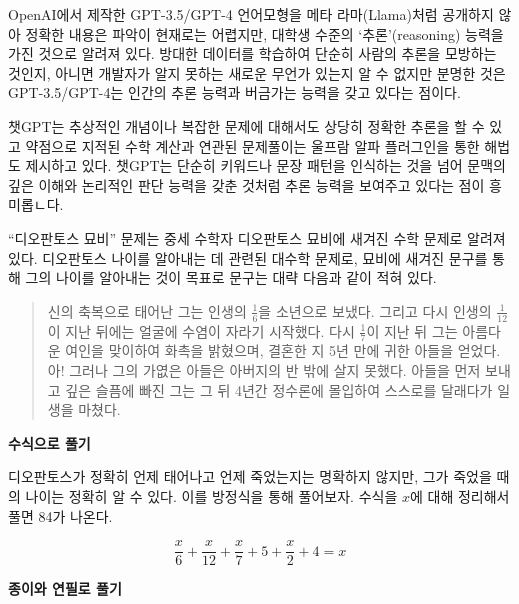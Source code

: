 \documentclass[
  letterpaper,
]{book}
\begin{document}
OpenAI에서 제작한 GPT-3.5/GPT-4 언어모형을 메타 라마(Llama)처럼 공개하지
않아 정확한 내용은 파악이 현재로는 어렵지만, 대학생 수준의
`추론'(reasoning) 능력을 가진 것으로 알려져 있다. 방대한 데이터를
학습하여 단순히 사람의 추론을 모방하는 것인지, 아니면 개발자가 알지
못하는 새로운 무언가 있는지 알 수 없지만 분명한 것은 GPT-3.5/GPT-4는
인간의 추론 능력과 버금가는 능력을 갖고 있다는 점이다.

챗GPT는 추상적인 개념이나 복잡한 문제에 대해서도 상당히 정확한 추론을 할
수 있고 약점으로 지적된 수학 계산과 연관된 문제풀이는 울프람 알파
플러그인을 통한 해법도 제시하고 있다. 챗GPT는 단순히 키워드나 문장
패턴을 인식하는 것을 넘어 문맥의 깊은 이해와 논리적인 판단 능력을 갖춘
것처럼 추론 능력을 보여주고 있다는 점이 흥미롭ㄴ다.

``디오판토스 묘비'' 문제는 중세 수학자 디오판토스 묘비에 새겨진 수학
문제로 알려져 있다. 디오판토스 나이를 알아내는 데 관련된 대수학 문제로,
묘비에 새겨진 문구를 통해 그의 나이를 알아내는 것이 목표로 문구는 대략
다음과 같이 적혀 있다.

\begin{quote}
신의 축복으로 태어난 그는 인생의 \(\frac{1}{6}\)을 소년으로 보냈다.
그리고 다시 인생의 \(\frac{1}{12}\) 이 지난 뒤에는 얼굴에 수염이 자라기
시작했다. 다시 \(\frac{1}{7}\)이 지난 뒤 그는 아름다운 여인을 맞이하여
화촉을 밝혔으며, 결혼한 지 5년 만에 귀한 아들을 얻었다. 아! 그러나 그의
가엾은 아들은 아버지의 반 밖에 살지 못했다. 아들을 먼저 보내고 깊은
슬픔에 빠진 그는 그 뒤 4년간 정수론에 몰입하여 스스로를 달래다가 일생을
마쳤다.
\end{quote}

\textbf{수식으로 풀기}

디오판토스가 정확히 언제 태어나고 언제 죽었는지는 명확하지 않지만, 그가
죽었을 때의 나이는 정확히 알 수 있다. 이를 방정식을 통해 풀어보자.
수식을 \(x\)에 대해 정리해서 풀면 84가 나온다.

\[\frac {x} {6} + \frac {x} {12} + \frac {x} {7} +  5 + \frac {x} {2} + 4 = x\]

\textbf{종이와 연필로 풀기}
\end{document}
